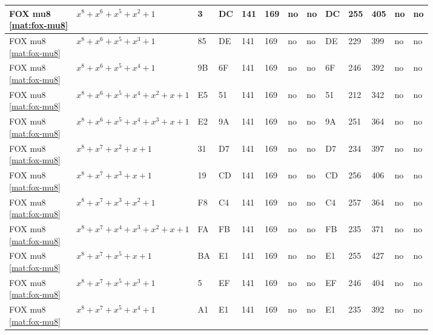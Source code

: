 \begin{tiny}
\begin{longtable}{|l|l|l|l|l|l|l|l|l|l|l|l|l|}
\shortstack{FOX mu8 \\ \eqref{mat:fox-mu8}} & $x^8 + x^6 + x^5 + x^2 + 1$ & 3 & DC & 141 & 169 & no & no & DC & 255 & 405 & no & no \\ \hline
\shortstack{FOX mu8 \\ \eqref{mat:fox-mu8}} & $x^8 + x^6 + x^5 + x^3 + 1$ & 85 & DE & 141 & 169 & no & no & DE & 229 & 399 & no & no \\ \hline
\shortstack{FOX mu8 \\ \eqref{mat:fox-mu8}} & $x^8 + x^6 + x^5 + x^4 + 1$ & 9B & 6F & 141 & 169 & no & no & 6F & 246 & 392 & no & no \\ \hline
\shortstack{FOX mu8 \\ \eqref{mat:fox-mu8}} & $x^8 + x^6 + x^5 + x^4 + x^2 + x + 1$ & E5 & 51 & 141 & 169 & no & no & 51 & 212 & 342 & no & no \\ \hline
\shortstack{FOX mu8 \\ \eqref{mat:fox-mu8}} & $x^8 + x^6 + x^5 + x^4 + x^3 + x + 1$ & E2 & 9A & 141 & 169 & no & no & 9A & 251 & 364 & no & no \\ \hline
\shortstack{FOX mu8 \\ \eqref{mat:fox-mu8}} & $x^8 + x^7 + x^2 + x + 1$ & 31 & D7 & 141 & 169 & no & no & D7 & 234 & 397 & no & no \\ \hline
\shortstack{FOX mu8 \\ \eqref{mat:fox-mu8}} & $x^8 + x^7 + x^3 + x + 1$ & 19 & CD & 141 & 169 & no & no & CD & 256 & 406 & no & no \\ \hline
\shortstack{FOX mu8 \\ \eqref{mat:fox-mu8}} & $x^8 + x^7 + x^3 + x^2 + 1$ & F8 & C4 & 141 & 169 & no & no & C4 & 257 & 364 & no & no \\ \hline
\shortstack{FOX mu8 \\ \eqref{mat:fox-mu8}} & $x^8 + x^7 + x^4 + x^3 + x^2 + x + 1$ & FA & FB & 141 & 169 & no & no & FB & 235 & 371 & no & no \\ \hline
\shortstack{FOX mu8 \\ \eqref{mat:fox-mu8}} & $x^8 + x^7 + x^5 + x + 1$ & BA & E1 & 141 & 169 & no & no & E1 & 255 & 427 & no & no \\ \hline
\shortstack{FOX mu8 \\ \eqref{mat:fox-mu8}} & $x^8 + x^7 + x^5 + x^3 + 1$ & 5 & EF & 141 & 169 & no & no & EF & 246 & 404 & no & no \\ \hline
\shortstack{FOX mu8 \\ \eqref{mat:fox-mu8}} & $x^8 + x^7 + x^5 + x^4 + 1$ & A1 & E1 & 141 & 169 & no & no & E1 & 235 & 392 & no & no \\ \hline

\end{longtable}
\end{tiny}
